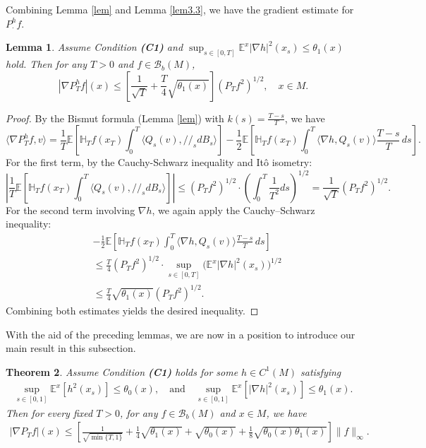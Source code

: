 \documentclass[11pt,twoside, reqno]{article}
\def\ptr {/\!/}
\newcommand\1{\mathbbm{1}}
\newcommand\E{\mathbb{E}}
\newtheorem{theorem}{Theorem}[section]
\newtheorem{lemma}[theorem]{Lemma}
\theoremstyle{definition}
\numberwithin{equation}{section}
\begin{document}
Combining Lemma \ref{lem} and Lemma \ref{lem3.3}, we have the gradient estimate for $P_{\cdot}^hf$. 

\begin{lemma}\label{s1.lem.key}
Assume Condition {\bf (C1)} and $\sup_{s\in [0,T]}\E^x |\nabla h|^2(x_s) \leq \theta_1(x)$ hold. Then for any \(T > 0\) and $f\in \mathcal{B}_b(M)$, 
\[
|\nabla P_T^h f|(x) \leq \left[ \frac{1}{\sqrt{T}} + \frac{T}{4} \sqrt{\theta_1(x)} \right] (P_T f^2)^{1/2},\quad x\in M.
\]
\end{lemma}

\begin{proof}
By the Bismut formula (Lemma \ref{lem}) with \(k(s) = \frac{T-s}{T}\), we have
\[
\langle \nabla P_T^h f, v \rangle = \frac{1}{T}\mathbb{E} \left[ \mathbb{H}_T f(x_T) \int_0^T \langle Q_s ( v), \ptr_s dB_s \rangle \right] - \frac{1}{2} \mathbb{E} \left[ \mathbb{H}_T f(x_T) \int_0^T \langle \nabla h, Q_s ( v) \rangle \frac{T-s}{T}\, ds \right].
\]
For the first term, by the Cauchy-Schwarz inequality and Itô isometry:
\[
\left|\frac{1}{T} \mathbb{E} \left[ \mathbb{H}_T f(x_T) \int_0^T \langle Q_s ( v), \ptr_s dB_s \rangle \right] \right| \leq (P_T f^2)^{1/2} \cdot \left( \int_0^T \frac{1}{T^2} ds \right)^{1/2} = \frac{1}{\sqrt{T}} (P_T f^2)^{1/2}.
\]
For the second term involving \( \nabla h \), we again apply the Cauchy–Schwarz inequality:  
\[
\begin{aligned}
&-\frac{1}{2}\mathbb{E} \left[ \mathbb{H}_T f(x_T) \int_0^T \langle \nabla h, Q_s ( v) \rangle \frac{T-s}{T}\, ds \right] \\
&\leq \frac{T}{4} (P_T f^2)^{1/2} \cdot  \sup_{s \in [0,T]} \bigl(\mathbb{E}^x |\nabla h|^2 (x_s)\bigr)^{1/2}\\
&\leq \frac{T}{4} \sqrt{\theta_1(x)} (P_T f^2)^{1/2}.
\end{aligned}
\]  
Combining both estimates yields the desired inequality.
\end{proof}




With the aid of the preceding lemmas, we are now in a position to introduce our main result in this subsection.


\begin{theorem}\label{s1.thm.2}
Assume Condition {\bf (C1)} holds for some $h\in C^1(M)$ satisfying
\begin{align*}
\sup_{s\in [0,1]}\mathbb{E}^x[ h^2(x_s)]\leq \theta_0(x),\quad  \mbox{and}\quad  \sup_{s\in [0,1]}\mathbb{E}^x[|\nabla h|^2 (x_s)] \leq \theta_1(x).
\end{align*}
Then for every fixed $T>0$, for any $f\in \mathcal{B}_b(M)$ and $x\in M$, we have
\begin{align*}
|\nabla P_Tf|(x)\leq \left[\frac{1}{\sqrt{\min\{T,1\}}}+\frac{1}{4}\sqrt{\theta_1(x)}+\sqrt{\theta_0(x)}  +\frac{1}{8}\sqrt{ \theta_0(x) \theta_1(x) } \right]\|f\|_{\infty}.
\end{align*}
\end{theorem}
\end{document}
